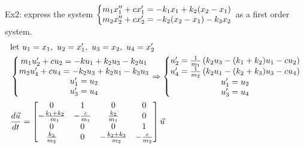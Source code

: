 \documentclass[11pt, fleqn]{article}
\begin{document}
Ex2: express the system $\displaystyle{\left\{\begin{matrix} m_1x_1''+cx_1'=-k_1x_1+k_2(x_2-x_1)\\m_2x_2''+cx_2'=-k_2(x_2-x_1)-k_3x_2 \end{matrix}\right.}$ as a first order system.
\begin{align*}
    &\text{let }u_1=x_1,\ u_2=x_1',\  u_3=x_2,\ u_4=x_2'\\
    &\eqnsystem{m_1u_2'+cu_2=-ku_1+k_2u_3-k_2u_1\\m_2u_4'+cu_4=-k_2u_3+k_2u_1-k_3u_3\\u_1'=u_2\\u_3'=u_4}\Ra \eqnsystem{u_2'=\frac{1}{m_1}\brround{k_2u_3-(k_1+k_2)u_1-cu_2}\\u_4'=\frac{1}{m_2}\brround{k_2u_1-(k_2+k_3)u_3-cu_4}\\u_1'=u_2\\u_3'=u_4}\\
    &\frac{d\vec{u}}{dt}=\matrixx{0&1&0&0\\-\frac{k_1+k_2}{m_1}&-\frac{c}{m_1}&\frac{k_2}{m_1}&0\\0&0&0&1\\\frac{k_2}{m_2}&0&-\frac{k_2+k_3}{m_2}&-\frac{c}{m_2}}\vec{u}
\end{align*}
\end{document}
